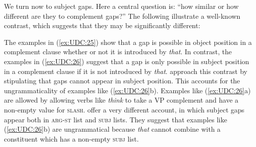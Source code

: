 \documentclass[output=paper
	        ,collection
	        ,collectionchapter
 	        ,biblatex
                ,babelshorthands
                ,newtxmath
                ,draftmode
                ,colorlinks, citecolor=brown
]{langscibook}
\begin{document}
{%


We turn now to subject gaps. Here a central question is: ``how similar or
how different are they to complement gaps?'' The following illustrate a
well-known contrast, which suggests that they may be significantly
different:

\begin{exe} \ex \begin{xlist} \label{ex:UDC:25}

\end{xlist}
\end{exe}

\begin{exe} \ex \begin{xlist} \label{ex:UDC:26}

\end{xlist}
\end{exe}

\noindent
The examples in (\ref{ex:UDC:25}) show that a gap is possible in
object position in a complement clause whether or not it is introduced
by \emph{that}. In contrast, the examples in (\ref{ex:UDC:26}) suggest
that a gap is only possible in subject position in a complement clause
if it is not introduced by
\emph{that}. \citet[Chapter~4.4]{Pollard:Sag:94} approach this
contrast by stipulating that gaps cannot appear in subject
position. This accounts for the ungrammaticality of examples like
(\ref{ex:UDC:26}b). Examples like (\ref{ex:UDC:26}a) are allowed by
allowing verbs like \textit{think} to take a VP complement and have a
non-empty value for
\textsc{slash}. \citet[Chapter~5.1.3]{Ginzburg:Sag:01} offer a very
different account, in which subject gaps appear both in
\textsc{arg-st} list and \textsc{subj} lists. They suggest that
examples like (\ref{ex:UDC:26}b) are ungrammatical because \emph{that}
cannot combine with a constituent which has a non-empty \textsc{subj}
list.

}
\end{document}
